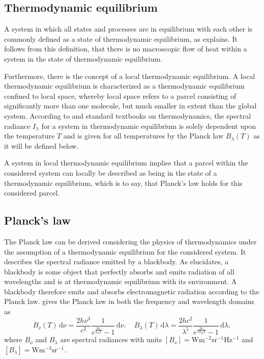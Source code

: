 \documentclass[a4paper,12pt]{report}
\begin{document}
\subsection{Thermodynamic equilibrium}
A system in which all states and processes are in equilibrium with each other is commonly defined as a state of thermodynamic equilibrium, as \cite[p.41]{Rutten.2015} explains. It follows from this definition, that there is no macroscopic flow of heat within a system in the state of thermodynamic equilibrium.

Furthermore, there is the concept of a local thermodynamic equilibrium. A local thermodynamic equilibrium is characterized as a thermodynamic equilibrium confined to local space, whereby local space refers to a parcel consisting of significantly more than one molecule, but much smaller in extent than the global system. According to \cite[p.41-42]{Rutten.2015} and standard textbooks on thermodynamics, the spectral radiance $I_\lambda$ for a system in thermodynamic equilibrium is solely dependent upon the temperature $T$ and is given for all temperatures by the Planck law $B_\lambda(T)$ as it will be defined below.

A system in local thermodynamic equilibrium implies that a parcel within the considered system can locally be described as being in the state of a thermodynamic equilibrium, which is to say, that Planck's law holds for this considered parcel.

\subsection{Planck's law}
The Planck law can be derived considering the physics of thermodynamics under the assumption of a thermodynamic equilibrium for the considered system. It describes the spectral radiance emitted by a blackbody. As \cite[p.9-10]{Liou.2002} elucidates, a blackbody is some object that perfectly absorbs and emits radiation of all wavelengths and is at thermodynamic equilibrium with its environment. A blackbody therefore emits and absorbs electromagnetic radiation according to the Planck law. \cite[p.42]{Rutten.2015} gives the Planck law in both the frequency and wavelength domains as
\begin{equation}\label{eq:Plancklaw}
B_\nu(T)\,\mathrm{d}\nu = \frac{2h\nu^3}{c^2}\frac{1}{e^{\frac{h\nu}{k_BT}}-1}\,\mathrm{d}\nu, \quad B_\lambda(T)\,\mathrm{d}\lambda = \frac{2hc^2}{\lambda^5}\frac{1}{e^{\frac{hc}{\lambda k_B T}}-1}\,\mathrm{d}\lambda,
\end{equation} where $B_\nu$ and $B_\lambda$ are spectral radiances with units $[B_\nu] = \si{\watt\meter^{-2}\steradian^{-1}\hertz^{-1}}$ and $[B_\lambda] = \si{\watt\meter^{-3}\steradian^{-1}}$.
\end{document}
